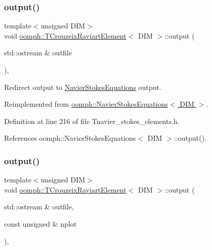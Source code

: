 \subsubsection{\texorpdfstring{output()}{output()}\hspace{0.1cm}{\footnotesize\ttfamily [1/4]}}
{\footnotesize\ttfamily template$<$unsigned D\+IM$>$ \\
void \hyperlink{classoomph_1_1TCrouzeixRaviartElement}{oomph\+::\+T\+Crouzeix\+Raviart\+Element}$<$ D\+IM $>$\+::output (\begin{DoxyParamCaption}\item[{std\+::ostream \&}]{outfile }\end{DoxyParamCaption})\hspace{0.3cm}{\ttfamily [inline]}, {\ttfamily [virtual]}}



Redirect output to \hyperlink{classoomph_1_1NavierStokesEquations}{Navier\+Stokes\+Equations} output. 



Reimplemented from \hyperlink{classoomph_1_1NavierStokesEquations_ae2c8742419aae8961eb34dad989c69b9}{oomph\+::\+Navier\+Stokes\+Equations$<$ D\+I\+M $>$}.



Definition at line 216 of file Tnavier\+\_\+stokes\+\_\+elements.\+h.



References oomph\+::\+Navier\+Stokes\+Equations$<$ D\+I\+M $>$\+::output().

\mbox{\label{classoomph_1_1TCrouzeixRaviartElement_ad8228b4af3ec6e393b0d23d23bfaf1ea}} 
\subsubsection{\texorpdfstring{output()}{output()}\hspace{0.1cm}{\footnotesize\ttfamily [2/4]}}
{\footnotesize\ttfamily template$<$unsigned D\+IM$>$ \\
void \hyperlink{classoomph_1_1TCrouzeixRaviartElement}{oomph\+::\+T\+Crouzeix\+Raviart\+Element}$<$ D\+IM $>$\+::output (\begin{DoxyParamCaption}\item[{std\+::ostream \&}]{outfile,  }\item[{const unsigned \&}]{nplot }\end{DoxyParamCaption})\hspace{0.3cm}{\ttfamily [inline]}, {\ttfamily [virtual]}}



